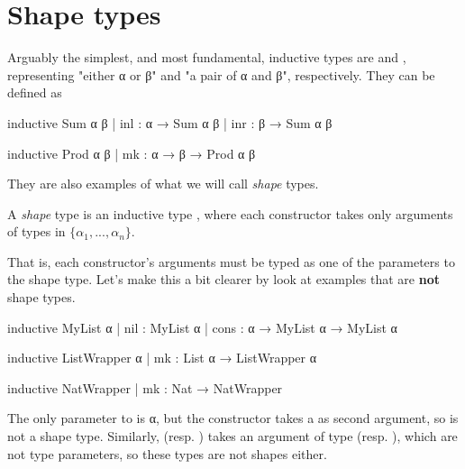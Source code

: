 \documentclass[titlepage]{report}
\newenvironment{definition}[1][Definition:]{\begin{trivlist}                         
    \item[\hskip \labelsep {\bfseries #1}]}{\end{trivlist}}
\begin{document}
\section{Shape types}

Arguably the simplest, and most fundamental, inductive types are  and ,
representing "either α or β" and "a pair of α and β", respectively.
They can be defined as

\begin{center}
\begin{minipage}[t]{0.45\linewidth}
    \begin{leancode}
inductive Sum α β
  | inl : α → Sum α β
  | inr : β → Sum α β
    \end{leancode}
\end{minipage}
\begin{minipage}[t]{0.45\linewidth}
    \begin{leancode}    
inductive Prod α β
  | mk : α → β → Prod α β
    \end{leancode}
\end{minipage}
\end{center}

They are also examples of what we will call \emph{shape} types.
\begin{definition}
    A \emph{shape} type is an inductive type , 
    where each constructor takes only arguments of types in $\{α_1, ..., α_n\}$.
\end{definition}
That is, each constructor's arguments must be typed as one of the parameters to the shape type.
Let's make this a bit clearer by look at examples that are \textbf{not} shape types. 

\begin{leancode}
    inductive MyList α
      | nil  : MyList α 
      | cons : α → MyList α → MyList α

    inductive ListWrapper α
      | mk : List α → ListWrapper α

    inductive NatWrapper
      | mk : Nat → NatWrapper
\end{leancode}

The only parameter to  is α, but the  constructor takes a  as second argument,
so  is not a shape type.
Similarly,  (resp. ) takes an argument of type  (resp. ),
which are not type parameters, so these types are not shapes either.
\end{document}
